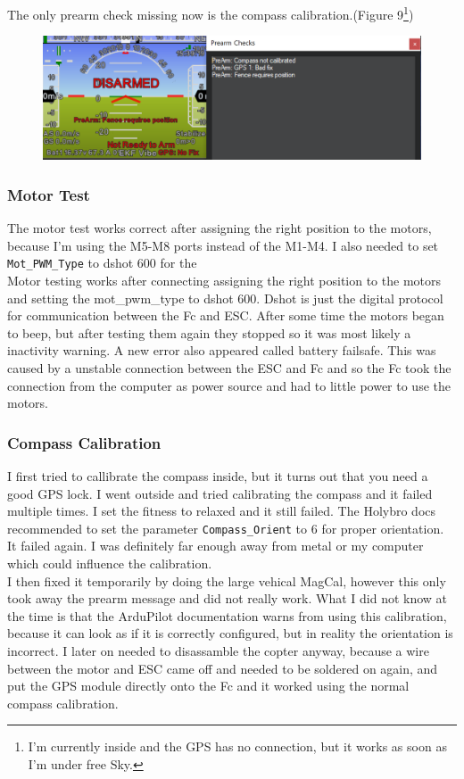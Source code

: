 \documentclass{article}
\begin{document}
	The only prearm check missing now is the compass calibration.(Figure 9\footnote{I'm currently inside and the GPS has no connection, but it works as soon as I'm under free Sky.})

\begin{figure}[h]
	\centering
	\includegraphics[width=0.7\linewidth]{pictures/prearmcheck}
	\caption{}
	\label{fig:prearmcheck}
\end{figure}


	\subsubsection{Motor Test}
	The motor test works correct after assigning the right position to the motors, because I'm using the M5-M8 ports instead of the M1-M4. I also needed to set \lstinline|Mot_PWM_Type| to dshot 600 for the 
	\\ Motor testing works after connecting assigning the right position to the motors and setting the mot\_pwm\_type to dshot 600. Dshot is just the digital protocol for communication between the Fc and ESC. After some time the motors began to beep, but after testing them again they stopped so it was most likely a inactivity warning. A new error also appeared called battery failsafe. This was caused by a unstable connection between the ESC and Fc and so the Fc took the connection from the computer as power source and had to little power to use the motors. 
	
	\subsubsection{Compass Calibration}
	I first tried to callibrate the compass inside, but it turns out that you need a good GPS lock. I went outside and tried calibrating the compass and it failed multiple times. I set the fitness to relaxed and it still failed. The Holybro docs\cite{holybrodocs} recommended to set the parameter \lstinline|Compass_Orient| to 6 for proper orientation. It failed again. I was definitely far enough away from metal or my computer which could influence the calibration.
	\\ I then fixed it temporarily by doing the large vehical MagCal, however this only took away the prearm message and did not really work. What I did not know at the time is that the ArduPilot documentation warns from using this calibration, because it can look as if it is correctly configured, but in reality the orientation is incorrect. 
	I later on needed to disassamble the copter anyway, because a wire between the motor and ESC came off and needed to be soldered on again, and put the GPS module directly onto the Fc and it worked using the normal compass calibration. 
	
\end{document}
